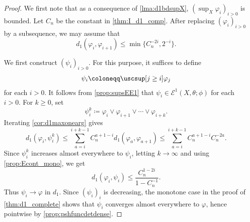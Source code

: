 \begin{proof}
    We first note that as a consequence of \cref{lma:d1bdsupX}, $(\sup_X \varphi_i)_{i>0}$ is bounded.
    Let $C_n$ be the constant in \cref{thm:I_d1_comp}. After replacing $(\varphi_i)_{i>0}$ by a subsequence, we may assume that
    \[
    d_1(\varphi_i,\varphi_{i+1})\leq \min\{C_n^{-2i},2^{-i}\}.
    \]

    We first construct $(\psi_i)_{i>0}$. For this purpose, it suffices to define
    \[
    \psi_i\coloneqq \uscsup[j\geq i] \varphi_j
    \]
    for each $i>0$.
    It follows from \cref{prop:supsEE1} that $\psi_i\in \mathcal{E}^1(X,\theta;\phi)$ for each $i>0$.
    For $k\geq 0$, set
    \[
        \psi_i^k\coloneqq \varphi_i\lor\varphi_{i+1}\lor\cdots\lor\varphi_{i+k}.
    \]
    Iterating \cref{cor:d1maxonearg} gives
    \[
    d_1(\varphi_i,\psi_i^k)\leq \sum_{a=i}^{i+k-1}C_n^{a+1-i}d_1(\varphi_a,\varphi_{a+1})\leq \sum_{a=i}^{i+k-1}C_n^{a+1-i}C_n^{-2a}.
    \]
    Since $\psi_i^k$ increases almost everywhere to $\psi_i$, letting $k\to\infty$ and using \cref{prop:Econt_mono}, we get
    \[
        d_1(\varphi_i,\psi_i)\leq \frac{C_n^{1-2i}}{1-C_n^{-1}}.
    \]
    Thus $\psi_i\to\varphi$ in $d_1$. Since $(\psi_i)_i$ is decreasing, the monotone case in the proof of \cref{thm:d1_complete} shows that $\psi_i$ converges almost everywhere to $\varphi$, hence pointwise by \cref{prop:pshfuncdetdense}.


\end{proof}
